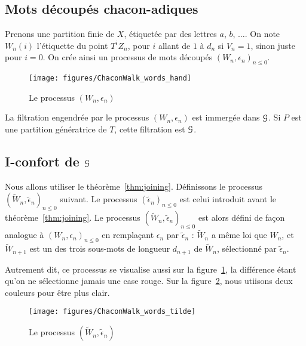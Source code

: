 \documentclass[12pt,a4paper]{article}
\begin{document}
\subsection{Mots découpés chacon-adiques}

Prenons une partition finie de $X$, étiquetée par des lettres $a$, $b$, $\ldots$.  
On note $W_n(i)$ l'étiquette du point $T^iZ_n$, pour $i$ allant de 
$1$ à $d_n$ si $V_n=1$, sinon juste pour $i=0$. 
On crée ainsi un processus de mots découpés ${(W_n, \epsilon_n)}_{n \leq 0}$. 

\begin{figure}[!h]
\centering
	\texttt{[image: figures/ChaconWalk\_words\_hand]}
\caption{Le processus $(W_n, \epsilon_n)$}\label{fig:Wn}
\end{figure}

La filtration engendrée par le processus $(W_n, \epsilon_n)$ est immergée dans 
$\EuScript{G}$. 
Si $P$ est une partition génératrice de $T$, cette filtration est 
 $\EuScript{G}$.  


\subsection{I-confort de $\EuScript{G}$}


Nous allons utiliser le théorème~\ref{thm:joining}. 
Définissons le processus  ${(\widetilde{W}_n, \widetilde{\epsilon}_n)}_{n \leq 0}$ suivant. 
Le processus ${(\widetilde{\epsilon}_n)}_{n \leq 0}$ est celui introduit 
avant le théorème~\ref{thm:joining}. 
Le processus  ${(\widetilde{W}_n, \widetilde{\epsilon}_n)}_{n \leq 0}$ 
est alors défini de façon analogue à ${(W_n, \epsilon_n)}_{n \leq 0}$ 
en remplaçant $\epsilon_n$ par $\widetilde{\epsilon}_n$ : 
$\widetilde{W}_n$ a même loi que $W_n$, et $\widetilde{W}_{n+1}$ est un 
des trois sous-mots de longueur $d_{n+1}$ de $\widetilde{W}_n$, sélectionné par 
$\widetilde{\epsilon}_n$. 

Autrement dit, ce processus se visualise aussi sur la figure~\ref{fig:Wn}, 
la différence étant qu'on ne sélectionne jamais une case rouge. 
Sur la figure~\ref{fig:tildeWn}, nous utiisons deux couleurs pour être plus clair.


\begin{figure}[!h]
\centering
	\texttt{[image: figures/ChaconWalk\_words\_tilde]}
\caption{Le processus $(\widetilde{W}_n, \widetilde{\epsilon}_n)$}\label{fig:tildeWn}
\end{figure}
\end{document}
